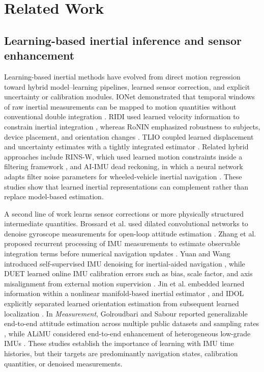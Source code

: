 \documentclass[preprint,12pt]{elsarticle}
\begin{document}
\section{Related Work}
\label{sec:related}

\subsection{Learning-based inertial inference and sensor enhancement}

Learning-based inertial methods have evolved from direct motion regression toward hybrid model--learning pipelines, learned sensor correction, and explicit uncertainty or calibration modules. IONet demonstrated that temporal windows of raw inertial measurements can be mapped to motion quantities without conventional double integration \cite{Chen2018IONet}. RIDI used learned velocity information to constrain inertial integration \cite{Yan2018RIDI}, whereas RoNIN emphasized robustness to subjects, device placement, and orientation changes \cite{Herath2020RoNIN}. TLIO coupled learned displacement and uncertainty estimates with a tightly integrated estimator \cite{Liu2020TLIO}. Related hybrid approaches include RINS-W, which used learned motion constraints inside a filtering framework \cite{Brossard2019RINSW}, and AI-IMU dead reckoning, in which a neural network adapts filter noise parameters for wheeled-vehicle inertial navigation \cite{Brossard2020AIIMU}. These studies show that learned inertial representations can complement rather than replace model-based estimation.

A second line of work learns sensor corrections or more physically structured intermediate quantities. Brossard et al. used dilated convolutional networks to denoise gyroscope measurements for open-loop attitude estimation \cite{Brossard2020DenoiseGyro}. Zhang et al. proposed recurrent processing of IMU measurements to estimate observable integration terms before numerical navigation updates \cite{Zhang2021IMUDataProcessing}. Yuan and Wang introduced self-supervised IMU denoising for inertial-aided navigation \cite{Yuan2023SelfSupervised}, while DUET learned online IMU calibration errors such as bias, scale factor, and axis misalignment from external motion supervision \cite{Liu2023DUET}. Jin et al. embedded learned information within a nonlinear manifold-based inertial estimator \cite{Jin2023LearningAided}, and IDOL explicitly separated learned orientation estimation from subsequent learned localization \cite{Sun2021IDOL}. In \emph{Measurement}, Golroudbari and Sabour reported generalizable end-to-end attitude estimation across multiple public datasets and sampling rates \cite{Golroudbari2023Measurement}, while ALiMU considered end-to-end enhancement of heterogeneous low-grade IMUs \cite{Sahu2026ALiMU}. These studies establish the importance of learning with IMU time histories, but their targets are predominantly navigation states, calibration quantities, or denoised measurements.
\end{document}
